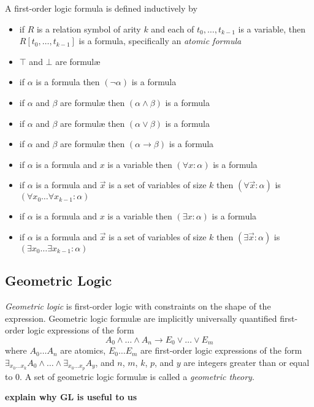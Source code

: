 		A first-order logic formula is defined inductively by
		\begin{itemize}
		\item if $R$ is a relation symbol of arity $k$ and each of $t_0 , \ldots , t_{k-1}$ is a variable, then $R[t_0,\ldots,t_{k-1}]$ is a formula, specifically an \emph{atomic formula}
		\item $\top$ and $\bot$ are formul{\ae}
		\item if $\alpha$ is a formula then $(\neg\alpha)$ is a formula
		\item if $\alpha$ and $\beta$ are formul{\ae} then $(\alpha\wedge\beta)$ is a formula
		\item if $\alpha$ and $\beta$ are formul{\ae} then $(\alpha\vee\beta)$ is a formula
		\item if $\alpha$ and $\beta$ are formul{\ae} then $(\alpha\to\beta)$ is a formula
		\item if $\alpha$ is a formula and $x$ is a variable then $(\forall x : \alpha)$ is a formula
		\item if $\alpha$ is a formula and $\vec{x}$ is a set of variables of size $k$ then $(\forall \vec{x} : \alpha)$ is $(\forall x_0 \ldots \forall x_{k-1} : \alpha)$
		\item if $\alpha$ is a formula and $x$ is a variable then $(\exists x : \alpha)$ is a formula
		\item if $\alpha$ is a formula and $\vec{x}$ is a set of variables of size $k$ then $(\exists \vec{x} : \alpha)$ is $(\exists x_0 \ldots \exists x_{k-1} : \alpha)$
		\end{itemize}

	\subsection{Geometric Logic}

		\emph{Geometric logic} is first-order logic with constraints on the
		shape of the expression.  Geometric logic formul{\ae} are implicitly
		universally quantified first-order logic expressions of the form \[A_0
		\wedge \ldots \wedge A_n \to E_0 \vee \ldots \vee E_m\] where $A_0
		\ldots A_n$ are atomics, $E_0 \ldots E_m$ are first-order logic
		expressions of the form $\exists_{x_0 \ldots x_k} A_0 \wedge \ldots
		\wedge \exists_{x_0 \ldots x_p} A_y$, and $n$, $m$, $k$, $p$, and $y$
		are integers greater than or equal to $0$. A set of geometric logic
		formul{\ae} is called a \emph{geometric theory}.

		\textbf{explain why GL is useful to us}

